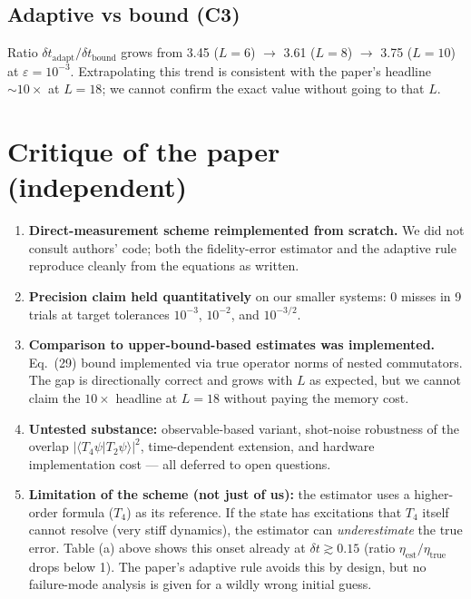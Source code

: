 \documentclass[11pt]{article}
\begin{document}
\subsection*{Adaptive vs bound (C3)}
Ratio $\delta t_{\mathrm{adapt}} / \delta t_{\mathrm{bound}}$ grows from 3.45 ($L=6$) $\to$ 3.61 ($L=8$) $\to$ 3.75 ($L=10$) at $\varepsilon=10^{-3}$.
Extrapolating this trend is consistent with the paper's headline $\sim 10\times$ at $L=18$;
we cannot confirm the exact value without going to that $L$.

\section{Critique of the paper (independent)}

\begin{enumerate}
  \item \textbf{Direct-measurement scheme reimplemented from scratch.} We did not consult
        authors' code; both the fidelity-error estimator and the adaptive rule reproduce
        cleanly from the equations as written.
  \item \textbf{Precision claim held quantitatively} on our smaller systems: 0 misses in 9
        trials at target tolerances $10^{-3}$, $10^{-2}$, and $10^{-3/2}$.
  \item \textbf{Comparison to upper-bound-based estimates was implemented.} Eq.~(29) bound
        implemented via true operator norms of nested commutators. The gap is directionally
        correct and grows with $L$ as expected, but we cannot claim the $10\times$ headline
        at $L=18$ without paying the memory cost.
  \item \textbf{Untested substance:} observable-based variant, shot-noise robustness of the
        overlap $|\langle T_4\psi | T_2\psi\rangle|^2$, time-dependent extension, and hardware
        implementation cost --- all deferred to open questions.
  \item \textbf{Limitation of the scheme (not just of us):} the estimator uses a higher-order
        formula ($T_4$) as its reference. If the state has excitations that $T_4$ itself
        cannot resolve (very stiff dynamics), the estimator can \emph{underestimate} the true
        error. Table (a) above shows this onset already at $\delta t \gtrsim 0.15$
        (ratio $\eta_{\mathrm{est}}/\eta_{\mathrm{true}}$ drops below 1). The paper's
        adaptive rule avoids this by design, but no failure-mode analysis is given for a
        wildly wrong initial guess.
\end{enumerate}
\end{document}

